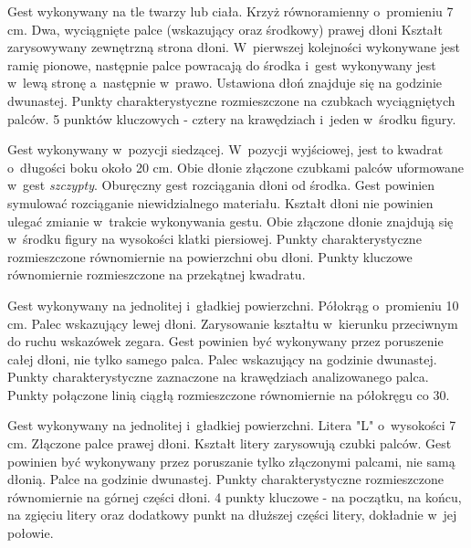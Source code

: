    \newpage
         {Gest wykonywany na tle twarzy lub ciała.}
         {Krzyż równoramienny o~promieniu 7 cm.}
         {Dwa, wyciągnięte palce (wskazujący oraz środkowy) prawej dłoni}
         {Kształt zarysowywany zewnętrzną strona dłoni.}
         {W~pierwszej kolejności wykonywane jest ramię pionowe, następnie palce powracają do środka i~gest wykonywany jest w~lewą stronę a~następnie w~prawo.}
         {Ustawiona dłoń znajduje się na godzinie dwunastej.}
         {Punkty charakterystyczne rozmieszczone na czubkach wyciągniętych palców.}
         {5 punktów kluczowych - cztery na krawędziach i~jeden w~środku figury.}

         {Gest wykonywany w~pozycji siedzącej.}
         {W~pozycji wyjściowej, jest to kwadrat o~długości boku około 20 cm.}
         {Obie dłonie złączone czubkami palców uformowane w~gest \textit{szczypty}.}
         {Oburęczny gest rozciągania dłoni od środka.}
         {Gest powinien symulować rozciąganie niewidzialnego materiału. Kształt dłoni nie powinien ulegać zmianie w~trakcie wykonywania gestu.}
         {Obie złączone dłonie znajdują się w~środku figury na wysokości klatki piersiowej.}
         {Punkty charakterystyczne rozmieszczone równomiernie na powierzchni obu dłoni.}
         {Punkty kluczowe równomiernie rozmieszczone na przekątnej kwadratu.}

    \newpage
         {Gest wykonywany na jednolitej i~gładkiej powierzchni.}
         {Półokrąg o~promieniu 10 cm.}
         {Palec wskazujący lewej dłoni.}
         {Zarysowanie kształtu w~kierunku przeciwnym do ruchu wskazówek zegara.}
         {Gest powinien być wykonywany przez poruszenie całej dłoni, nie tylko samego palca.}
         {Palec wskazujący na godzinie dwunastej.}
         {Punkty charakterystyczne zaznaczone na krawędziach analizowanego palca.}
         {Punkty połączone linią ciągłą rozmieszczone równomiernie na półokręgu co 30\degree.}

         {Gest wykonywany na jednolitej i~gładkiej powierzchni.}
         {Litera "L" o~wysokości 7 cm.}
         {Złączone palce prawej dłoni.}
         {Kształt litery zarysowują czubki palców.}
         {Gest powinien być wykonywany przez poruszanie tylko złączonymi palcami, nie samą dłonią.}
         {Palce na godzinie dwunastej.}
         {Punkty charakterystyczne rozmieszczone równomiernie na górnej części dłoni.}
         {4 punkty kluczowe - na początku, na końcu, na zgięciu litery oraz dodatkowy punkt na dłuższej części litery, dokładnie w~jej połowie.}

